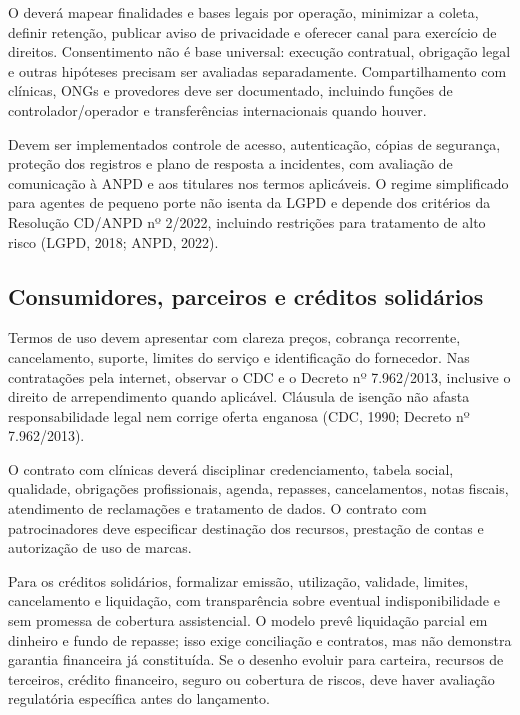 O \projeto{} deverá mapear finalidades e bases legais por operação, minimizar a coleta, definir retenção, publicar aviso de privacidade e oferecer canal para exercício de direitos. Consentimento não é base universal: execução contratual, obrigação legal e outras hipóteses precisam ser avaliadas separadamente. Compartilhamento com clínicas, ONGs e provedores deve ser documentado, incluindo funções de controlador/operador e transferências internacionais quando houver.

Devem ser implementados controle de acesso, autenticação, cópias de segurança, proteção dos registros e plano de resposta a incidentes, com avaliação de comunicação à ANPD e aos titulares nos termos aplicáveis. O regime simplificado para agentes de pequeno porte não isenta da LGPD e depende dos critérios da Resolução CD/ANPD nº 2/2022, incluindo restrições para tratamento de alto risco (LGPD, 2018; ANPD, 2022).

\subsection{Consumidores, parceiros e créditos solidários}
Termos de uso devem apresentar com clareza preços, cobrança recorrente, cancelamento, suporte, limites do serviço e identificação do fornecedor. Nas contratações pela internet, observar o CDC e o Decreto nº 7.962/2013, inclusive o direito de arrependimento quando aplicável. Cláusula de isenção não afasta responsabilidade legal nem corrige oferta enganosa (CDC, 1990; Decreto nº 7.962/2013).

O contrato com clínicas deverá disciplinar credenciamento, tabela social, qualidade, obrigações profissionais, agenda, repasses, cancelamentos, notas fiscais, atendimento de reclamações e tratamento de dados. O contrato com patrocinadores deve especificar destinação dos recursos, prestação de contas e autorização de uso de marcas.

Para os créditos solidários, formalizar emissão, utilização, validade, limites, cancelamento e liquidação, com transparência sobre eventual indisponibilidade e sem promessa de cobertura assistencial. O modelo prevê liquidação parcial em dinheiro e fundo de repasse; isso exige conciliação e contratos, mas não demonstra garantia financeira já constituída. Se o desenho evoluir para carteira, recursos de terceiros, crédito financeiro, seguro ou cobertura de riscos, deve haver avaliação regulatória específica antes do lançamento.

